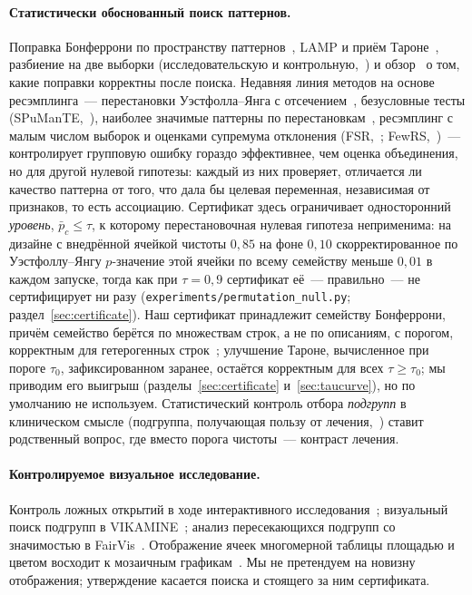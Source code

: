 \documentclass[11pt]{article}
\begin{document}
\paragraph{Статистически обоснованный поиск паттернов.} Поправка Бонферрони по пространству паттернов~\citep{webb2007}, LAMP и приём Тароне~\citep{terada2013,llinares2015}, разбиение на две выборки (исследовательскую и контрольную,~\citealp{webb2007}) и обзор~\citet{hamalainen2019} о том, какие поправки корректны после поиска. Недавняя линия методов на основе ресэмплинга~--- перестановки Уэстфолла--Янга с отсечением~\citep{llinares2015}, безусловные тесты (SPuManTE,~\citealp{pellegrina2019}), наиболее значимые паттерны по перестановкам~\citep{pellegrina2020}, ресэмплинг с малым числом выборок и оценками супремума отклонения (FSR,~\citealp{pellegrina2024}; FewRS,~\citealp{pellegrina2026})~--- контролирует групповую ошибку гораздо эффективнее, чем оценка объединения, но для другой нулевой гипотезы: каждый из них проверяет, отличается ли качество паттерна от того, что дала бы целевая переменная, независимая от признаков, то есть ассоциацию. Сертификат здесь ограничивает односторонний \emph{уровень}, $\bar p_c\le\tau$, к которому перестановочная нулевая гипотеза неприменима: на дизайне с внедрённой ячейкой чистоты $0{,}85$ на фоне $0{,}10$ скорректированное по Уэстфоллу--Янгу $p$-значение этой ячейки по всему семейству меньше $0{,}01$ в каждом запуске, тогда как при $\tau=0{,}9$ сертификат её~--- правильно~--- не сертифицирует ни разу (\texttt{experiments/permutation\_null.py}; раздел~\ref{sec:certificate}). Наш сертификат принадлежит семейству Бонферрони, причём семейство берётся по множествам строк, а не по описаниям, с порогом, корректным для гетерогенных строк~\citep{hoeffding1956}; улучшение Тароне, вычисленное при пороге $\tau_0$, зафиксированном заранее, остаётся корректным для всех $\tau\ge\tau_0$; мы приводим его выигрыш (разделы~\ref{sec:certificate} и~\ref{sec:taucurve}), но по умолчанию не используем. Статистический контроль отбора \emph{подгрупп} в клиническом смысле (подгруппа, получающая пользу от лечения,~\citealp{schnell2023}) ставит родственный вопрос, где вместо порога чистоты~--- контраст лечения.

\paragraph{Контролируемое визуальное исследование.} Контроль ложных открытий в ходе интерактивного исследования~\citep{zhao2017,zgraggen2018}; визуальный поиск подгрупп в VIKAMINE~\citep{atzmueller2005}; анализ пересекающихся подгрупп со значимостью в FairVis~\citep{cabrera2019}. Отображение ячеек многомерной таблицы площадью и цветом восходит к мозаичным графикам~\citep{friendly1994}. Мы не претендуем на новизну отображения; утверждение касается поиска и стоящего за ним сертификата.
\end{document}
